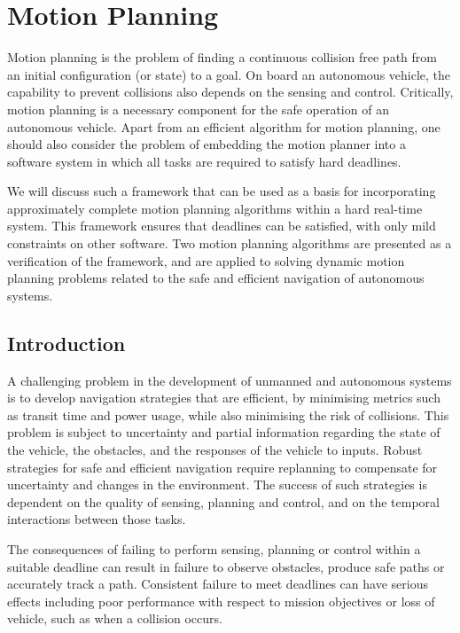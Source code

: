 \section{Motion Planning}
\label{motion_planning}

Motion planning is the problem of finding a continuous collision free path from an initial
configuration (or state) to a goal. On board an autonomous vehicle, the capability to prevent
collisions also depends on the sensing and control. Critically, motion planning is a necessary
component for the safe operation of an autonomous vehicle. Apart from an efficient algorithm
for motion planning, one should also consider  the problem of embedding the motion planner 
into a software system in which all tasks are required to satisfy hard deadlines. 

We will discuss such a  framework that can be used as a basis for incorporating approximately complete motion planning algorithms within a
hard real-time system. This framework ensures that deadlines can be satisfied, with only mild
constraints on other software. Two motion planning algorithms are presented as a verification
of the framework, and are applied to solving dynamic motion planning problems related to the
safe and efficient navigation of autonomous systems.


\subsection{Introduction}
\label{introduction_motion_planning}
A challenging problem in the development of unmanned and autonomous systems is to develop
navigation strategies that are efficient, by minimising metrics such as transit time and power
usage, while also minimising the risk of collisions. This problem is subject to uncertainty
and partial information regarding the state of the vehicle, the obstacles, and the responses of
the vehicle to inputs. Robust strategies for safe and efficient navigation require replanning to
compensate for uncertainty and changes in the environment. The success of such strategies
is dependent on the quality of sensing, planning and control, and on the temporal interactions
between those tasks.


The consequences of failing to perform sensing, planning or control within a suitable deadline can result in 
failure to observe obstacles, produce safe paths or accurately track a path.
Consistent failure to meet deadlines can have serious effects including poor performance with
respect to mission objectives or loss of vehicle, such as when a collision occurs.

